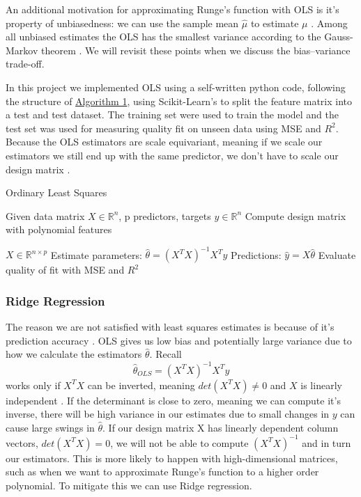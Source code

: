 \documentclass[amssymb,twocolumn,aps]{revtex4}
\begin{document}
An additional motivation for approximating Runge's function with OLS is it's property of unbiasedness: we can use the sample  mean \textit{$\hat{\mu}$ }to estimate $\mu$ \cite{introstat}. Among all unbiased estimates the OLS has the smallest variance according to the Gauss-Markov theorem \cite{hastie1}. We will revisit these points when we discuss the bias–variance trade-off.

In this project we implemented OLS using a self-written python code, following the structure of \hyperref[algorithm:OLS]{Algorithm 1}, using Scikit-Learn's  \cite{scikit-learn} to split the feature matrix into a test and test dataset. The training set were used to train the model and the test set was used for measuring quality fit on unseen data using MSE and $R^2$. Because the OLS estimators are scale equivariant, meaning if we scale our estimators we still end up with the same predictor, we don't have to scale our design matrix \cite{introstat}.


\begin{algorithm}[H]
    \caption{Ordinary Least Squares}
    \label{algorithm:OLS}
    \begin{algorithmic}[1]
        \State Given data matrix $X \in \mathbb{R}^{n}$, p predictors, targets $y \in \mathbb{R}^n$
        \State Compute design matrix with polynomial features

        $X \in \mathbb{R}^{n \times p}$
        \State Estimate parameters:
        $\hat{\theta} = (X^T X)^{-1} X^T y$
        \State Predictions: $\hat{y} = X \hat{\theta}$
        \State Evaluate quality of fit with MSE and $R^2$
    \end{algorithmic}
\end{algorithm}


\subsubsection{Ridge Regression}

The reason we are not satisfied with least squares estimates is because of it's prediction accuracy \cite{fysml2}. OLS gives us low bias and potentially large variance due to how we calculate the estimators $\hat{\theta}$. Recall
$$\hat{\theta}_{OLS} = (X^TX)^{-1}X^Ty$$
works only if $X^TX$ can be inverted, meaning $det(X^TX) \neq 0$ and $X$ is linearly independent \cite{fysml2}. If the determinant is close to zero, meaning we can compute it's inverse, there will be high variance in our estimates due to small changes in $y$ can cause large swings in $\hat{\theta}$. If our design matrix X has linearly dependent column vectors, $det(X^TX) = 0$, we will not be able to compute $(X^TX)^{-1}$ and in turn our estimators. This is more likely to happen with high-dimensional matrices, such as when we want to approximate Runge's function to a higher order polynomial. To mitigate this we can use Ridge regression.
\end{document}
